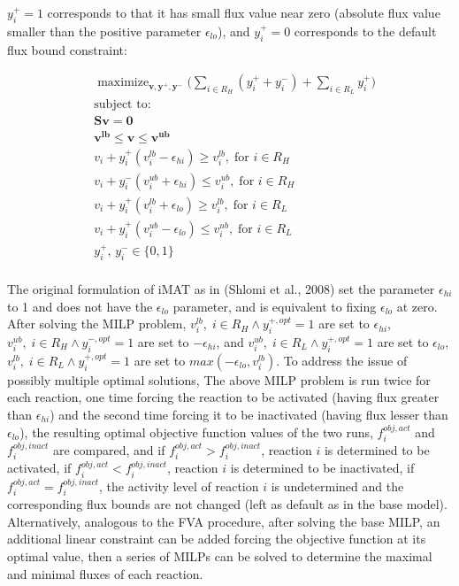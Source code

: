 \documentclass[12pt,twoside,openany,\mydriver]{thesis}  %
\DeclareMathOperator*{\maximize}{maximize}
\begin{document}
\(y^+_i=1\) corresponds to that it has small flux value near zero (absolute flux value smaller than the positive parameter \(\epsilon_{lo}\)), and \(y^+_i=0\) corresponds to the default flux bound constraint:

\[
\begin{aligned}
&\maximize_{\mathbf{v,y^+,y^-}} \bigg( \sum_{i\in R_H}(y^+_i+y^-_i) + \sum_{i\in R_L}y^+_i \bigg)  \\
&\text{subject to:} \\
&\mathbf{Sv = 0} \\
&\mathbf{v^{lb} \le v \le v^{ub}} \\
&v_i + y^+_i(v^{lb}_i - \epsilon_{hi}) \ge v^{lb}_i,\; \text{for } i\in R_H \\
&v_i + y^-_i(v^{ub}_i + \epsilon_{hi}) \le v^{ub}_i,\; \text{for } i\in R_H \\
&v_i + y^+_i(v^{lb}_i + \epsilon_{lo}) \ge v^{lb}_i,\; \text{for } i\in R_L \\
&v_i + y^+_i(v^{ub}_i - \epsilon_{lo}) \le v^{ub}_i,\; \text{for } i\in R_L \\
&y^+_i,\, y^-_i \in \{0,1\} \\
\end{aligned}
\]

The original formulation of iMAT as in (Shlomi et al., 2008) set the parameter \(\epsilon_{hi}\) to 1 and does not have the \(\epsilon_{lo}\) parameter, and is equivalent to fixing \(\epsilon_{lo}\) at zero. After solving the MILP problem, \(v^{lb}_i,\; i\in R_H \land y^{+,opt}_i=1\) are set to \(\epsilon_{hi}\), \(v^{ub}_i,\; i\in R_H \land y^{-,opt}_i=1\) are set to \(-\epsilon_{hi}\), and \(v^{ub}_i,\; i\in R_L \land y^{+,opt}_i=1\) are set to \(\epsilon_{lo}\), \(v^{lb}_i,\; i\in R_L \land y^{+,opt}_i=1\) are set to \(max(-\epsilon_{lo}, v^{lb}_i)\). To address the issue of possibly multiple optimal solutions, The above MILP problem is run twice for each reaction, one time forcing the reaction to be activated (having flux greater than \(\epsilon_{hi}\)) and the second time forcing it to be inactivated (having flux lesser than \(\epsilon_{lo}\)), the resulting optimal objective function values of the two runs, \(f^{obj,act}_i\) and \(f^{obj,inact}_i\) are compared, and if \(f^{obj,act}_i > f^{obj,inact}_i\), reaction \(i\) is determined to be activated, if \(f^{obj,act}_i < f^{obj,inact}_i\), reaction \(i\) is determined to be inactivated, if \(f^{obj,act}_i = f^{obj,inact}_i\), the activity level of reaction \(i\) is undetermined and the corresponding flux bounds are not changed (left as default as in the base model). Alternatively, analogous to the FVA procedure, after solving the base MILP, an additional linear constraint can be added forcing the objective function at its optimal value, then a series of MILPs can be solved to determine the maximal and minimal fluxes of each reaction.
\end{document}

